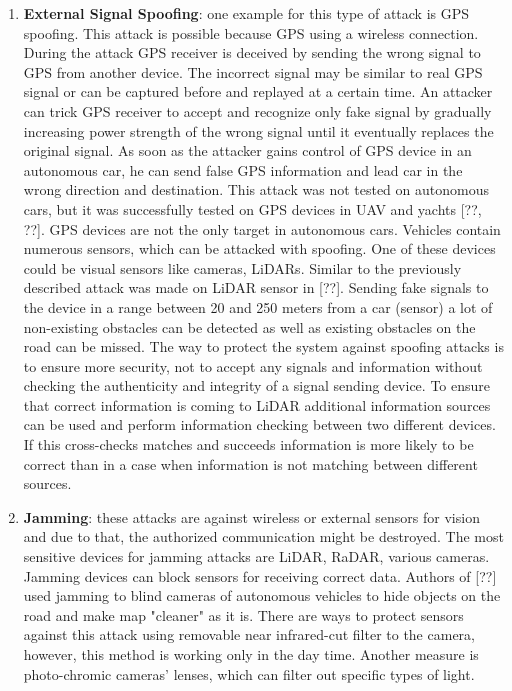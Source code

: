 \begin{enumerate}
	\item \textbf{External Signal Spoofing}: one example for this type of attack is \gls{GPS} spoofing. This attack is possible because \gls{GPS} using a wireless connection. During the attack \gls{GPS} receiver is deceived by sending the wrong signal to \gls{GPS} from another device. The incorrect signal may be similar to real \gls{GPS} signal or can be captured before and replayed at a certain time. An attacker can trick \gls{GPS} receiver to accept and recognize only fake signal by gradually increasing power strength of the wrong signal until it eventually replaces the original signal. As soon as the attacker gains control of \gls{GPS} device in an autonomous car, he can send false \gls{GPS} information and lead car in the wrong direction and destination. This attack was not tested on autonomous cars, but it was successfully tested on \gls{GPS} devices in \gls{UAV} and yachts [??, ??].
	\gls{GPS} devices are not the only target in autonomous cars. Vehicles contain numerous sensors, which can be attacked with spoofing. One of these devices could be visual sensors like cameras, \glspl{LiDAR}. Similar to the previously described attack was made on \gls{LiDAR} sensor in [??]. Sending fake signals to the device in a range between 20 and 250 meters from a car (sensor) a lot of non-existing obstacles can be detected as well as existing obstacles on the road can be missed. 
	The way to protect the system against spoofing attacks is to ensure more security, not to accept any signals and information without checking the authenticity and integrity of a signal sending device. To ensure that correct information is coming to \gls{LiDAR} additional information sources can be used and perform information checking between two different devices. If this cross-checks matches and succeeds information is more likely to be correct than in a case when information is not matching between different sources.
	\item \textbf{Jamming}: these attacks are against wireless or external sensors for vision and due to that, the authorized communication might be destroyed. The most sensitive devices for jamming attacks are \gls{LiDAR}, \gls{RaDAR}, various cameras. Jamming devices can block sensors for receiving correct data. Authors of [??] used jamming to blind cameras of autonomous vehicles to hide objects on the road and make map "cleaner" as it is. There are ways to protect sensors against this attack using removable near infrared-cut filter to the camera, however, this method is working only in the day time. Another measure is photo-chromic cameras' lenses, which can filter out specific types of light.
\end{enumerate} 

